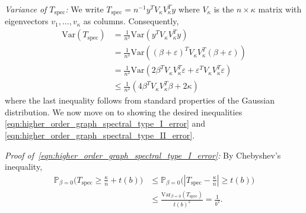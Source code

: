 \documentclass{article}
\newcommand{\abs}[1]{\left \lvert #1 \right \rvert}
\newcommand{\Var}{\mathrm{Var}}
\newcommand{\1}{\mathbf{1}}
\newcommand{\Pbb}{\mathbb{P}}
\newcommand{\spec}{\mathrm{spec}}
\theoremstyle{alden}
\theoremstyle{aldenthm}
\theoremstyle{definition}
\theoremstyle{remark}
\begin{document}
\vspace{.2 in}

\textit{Variance of $T_{\mathrm{spec}}$:}
We write $T_{\mathrm{spec}} = n^{-1} y^T V_{\kappa} V_{\kappa}^T y$ where $V_{\kappa}$ is the $n \times \kappa$ matrix with eigenvectors $v_1,\ldots,v_{\kappa}$ as columns. Consequently,
\begin{align}
\Var(T_{\spec}) & = \frac{1}{n^2} \Var(y^T V_{\kappa} V_{\kappa}^T y) \\
& = \frac{1}{n^2} \Var((\beta + \varepsilon)^T V_{\kappa} V_{\kappa}^T (\beta + \varepsilon)) \\
& = \frac{1}{n^2} \Var(2 \beta^T V_{\kappa} V_{\kappa}^T \varepsilon + \varepsilon^T V_{\kappa} V_{\kappa}^T \varepsilon) \\
& \leq \frac{1}{n^2}(4 \beta^T V_{\kappa} V_{\kappa}^T \beta + 2\kappa)
\end{align}
where the last inequality follows from standard properties of the Gaussian distribution. We now move on to showing the desired inequalities \eqref{eqn:higher_order_graph_spectral_type_I_error} and \eqref{eqn:higher_order_graph_spectral_type_II_error}.

\vspace{.2 in}

\textit{Proof of~\eqref{eqn:higher_order_graph_spectral_type_I_error}:} By Chebyshev's inequality,
\begin{align*}
\Pbb_{\beta = 0}\bigl(T_{\spec} \geq \frac{\kappa}{n} + t(b)\bigr)
& \leq \Pbb_{\beta = 0}\bigl(\abs{T_{\spec} - \frac{\kappa}{n}} \geq t(b)\bigr) \\
& \leq \frac{\Var_{\beta = 0}(T_{\spec})}{t(b)^2} = \frac{1}{b^2}.
\end{align*}

\vspace{.2 in}
\end{document}
